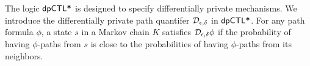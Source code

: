 
The logic $\textsf{dpCTL*}$ is designed to specify differentially private
mechanisms. We introduce the differentially private path quantifer
$\mathcal{D}_{{\epsilon}, {\delta}}$ in $\textsf{dpCTL*}$. For any path formula
$\phi$, a state $s$ in a Markov chain $K$ satisfies
$\mathcal{D}_{{\epsilon}, {\delta}} \phi$ if the probability of having $\phi$-paths
from $s$ is close to the probabilities of
having $\phi$-paths from its neighbors.

